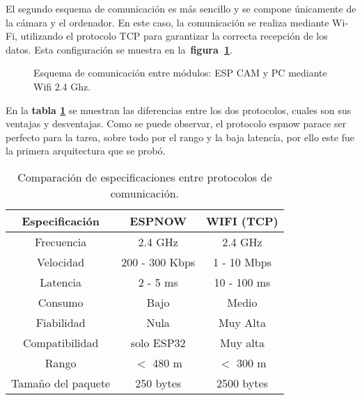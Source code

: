 El segundo esquema de comunicación es más sencillo y se compone únicamente de la cámara y el ordenador. En este caso, la comunicación se realiza mediante Wi-Fi, utilizando el protocolo TCP para garantizar la correcta recepción de los datos. Esta configuración se muestra en la~\textbf{figura~\ref{fig:comms_esquema_wifi}}.

\vspace{1cm}
\begin{figure}[H] %
    \centering
    \caption{Esquema de comunicación entre módulos: ESP CAM y PC mediante Wifi 2.4 Ghz.}
    \label{fig:comms_esquema_wifi}
\end{figure}

En la \textbf{tabla \ref{tab:comp_now_wifi}} se muestran las diferencias entre los dos protocolos, cuales son sus ventajas y desventajas. Como se puede observar, el protocolo espnow parace ser perfecto para la tarea, sobre todo por el rango y la baja latencía, por ello este fue la primera arquitectura que se probó.

\begin{table}[H]
    \centering
    \begin{tabular}{|c|c|c|}
        \hline
        \textbf{Especificación} & \textbf{ESPNOW} & \textbf{WIFI (TCP)} \\
        \hline
        Frecuencia      & 2.4 GHz & 2.4 GHz \\
        Velocidad       & 200 - 300 Kbps & 1 - 10 Mbps \\
        Latencia        & 2 - 5 ms & 10 - 100 ms\\
        Consumo         & Bajo & Medio \\
        Fiabilidad      & Nula & Muy Alta\\
        Compatibilidad  & solo ESP32 & Muy alta\\
        Rango           & $<$ 480 m & $<$ 300 m\\
        Tamaño del paquete & 250 bytes & 2500 bytes \\
        \hline
    \end{tabular}
    \caption{Comparación de especificaciones entre protocolos de comunicación.}
    \label{tab:comp_now_wifi}
\end{table}
